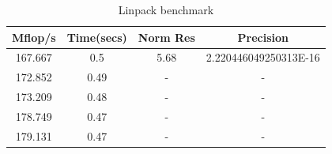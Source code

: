 \begin{table}[h]%
\vspace{0.8in}
\caption{Linpack benchmark \cite{Dongarra2006}}
\vspace{0.2in}
\small
\begin{center}
\begin{tabular}{cccc} \hline
Mflop/s & Time(secs) &  Norm Res &  Precision \\ \hline
167.667 & 0.5        &    5.68   &  2.220446049250313E-16 \\
172.852 & 0.49       &    -   &  - \\
173.209 & 0.48       &    -   &  - \\
178.749 & 0.47       &    -   &  - \\
179.131 & 0.47       &    -   &  - \\ \hline
\end{tabular}
\end{center}
\label{tab:Linpack Benchmark}
\end{table}

